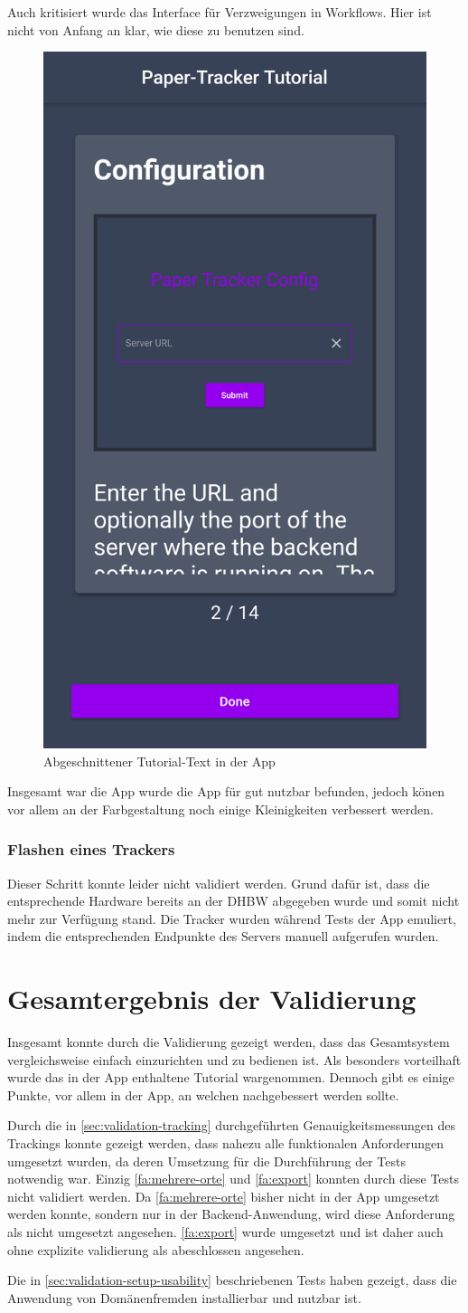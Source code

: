 Auch kritisiert wurde das Interface für Verzweigungen in Workflows. Hier ist nicht von Anfang an
klar, wie diese zu benutzen sind.

\begin{figure}[htbp]
	\centering
	\includegraphics[width=.3\textwidth]{images/screenshot_app_tutorial_feedback.png}
	\caption{Abgeschnittener Tutorial-Text in der App}
	\label{fig:tutorial-feedback}
\end{figure}

Insgesamt war die App wurde die App für gut nutzbar befunden, jedoch könen vor allem an der
Farbgestaltung noch einige Kleinigkeiten verbessert werden.

\subsubsection{Flashen eines Trackers}

Dieser Schritt konnte leider nicht validiert werden. Grund dafür ist, dass die entsprechende
Hardware bereits an der \gls{DHBW} abgegeben wurde und somit nicht mehr zur Verfügung stand.
Die Tracker wurden während Tests der App emuliert, indem die entsprechenden Endpunkte des Servers
manuell aufgerufen wurden.

\section{Gesamtergebnis der Validierung}

Insgesamt konnte durch die Validierung gezeigt werden, dass das Gesamtsystem vergleichsweise einfach
einzurichten und zu bedienen ist. Als besonders vorteilhaft wurde das in der App enthaltene Tutorial
wargenommen. Dennoch gibt es einige Punkte, vor allem in der App, an welchen nachgebessert werden
sollte.

Durch die in \autoref{sec:validation-tracking} durchgeführten Genauigkeitsmessungen des Trackings
konnte gezeigt werden, dass nahezu alle funktionalen Anforderungen umgesetzt wurden, da deren
Umsetzung für die Durchführung der Tests notwendig war. Einzig \ref{fa:mehrere-orte} und
\ref{fa:export} konnten durch diese Tests nicht validiert werden. Da \ref{fa:mehrere-orte} bisher
nicht in der App umgesetzt werden konnte, sondern nur in der Backend-Anwendung, wird diese
Anforderung als nicht umgesetzt angesehen. \ref{fa:export} wurde umgesetzt und ist daher auch ohne
explizite validierung als abeschlossen angesehen.

Die in \autoref{sec:validation-setup-usability} beschriebenen Tests haben gezeigt, dass die
Anwendung von Domänenfremden installierbar und nutzbar ist.
